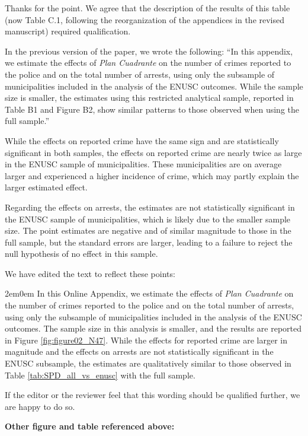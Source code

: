 
Thanks for the point. We agree that the description of the results of this table (now Table C.1, following the reorganization of the appendices in the revised manuscript) required qualification.

In the previous version of the paper, we wrote the following: ``In this appendix, we estimate the effects of \emph{Plan Cuadrante} on the number of crimes reported to the police and on the total number of arrests, using only the subsample of municipalities included in the analysis of the ENUSC outcomes. While the sample size is smaller, the estimates using this restricted analytical sample, reported in Table B1 and Figure B2, show similar patterns to those observed when using the full sample.''

While the effects on reported crime have the same sign and are statistically significant in both samples, the effects on reported crime are nearly twice as large in the ENUSC sample of municipalities. These municipalities are on average larger and experienced a higher incidence of crime, which may partly explain the larger estimated effect.

Regarding the effects on arrests, the estimates are not statistically significant in the ENUSC sample of municipalities, which is likely due to the smaller sample size. The point estimates are negative and of similar magnitude to those in the full sample, but the standard errors are larger, leading to a failure to reject the null hypothesis of no effect in this sample. 

We have edited the text to reflect these points:

\begin{adjustwidth}{2em}{0em}
In this Online Appendix, we estimate the effects of \emph{Plan Cuadrante} on the number of crimes reported to the police and on the total number of arrests, using only the subsample of municipalities included in the analysis of the ENUSC outcomes. The sample size in this analysis is smaller, and the results are reported in Figure \ref{fig:figure02_N47}. While the effects for reported crime are larger in magnitude and the effects on arrests are not statistically significant in the ENUSC subsample, the estimates are qualitatively similar to those observed in Table \ref{tab:SPD_all_vs_enusc} with the full sample.
\end{adjustwidth}

If the editor or the reviewer feel that this wording should be qualified further, we are happy to do so.

\clearpage
\noindent\textbf{Other figure and table referenced above:}
\vspace{0.5em}

{\renewcommand{\thetable}{C.1}
}

\clearpage

{\renewcommand{\thefigure}{C.1}
}

\clearpage